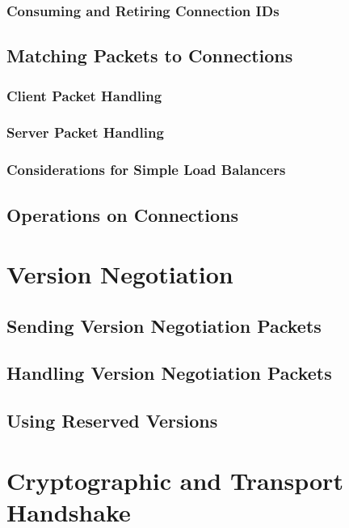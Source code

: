 \documentclass{article}
\begin{document}
\subsubsection{Consuming and Retiring Connection IDs}

\subsection{Matching Packets to Connections}

\subsubsection{Client Packet Handling}

\subsubsection{Server Packet Handling}

\subsubsection{Considerations for Simple Load Balancers}

\subsection{Operations on Connections}

\section{Version Negotiation}

\subsection{Sending Version Negotiation Packets}

\subsection{Handling Version Negotiation Packets}

\subsection{Using Reserved Versions}

\section{Cryptographic and Transport Handshake}
\end{document}
